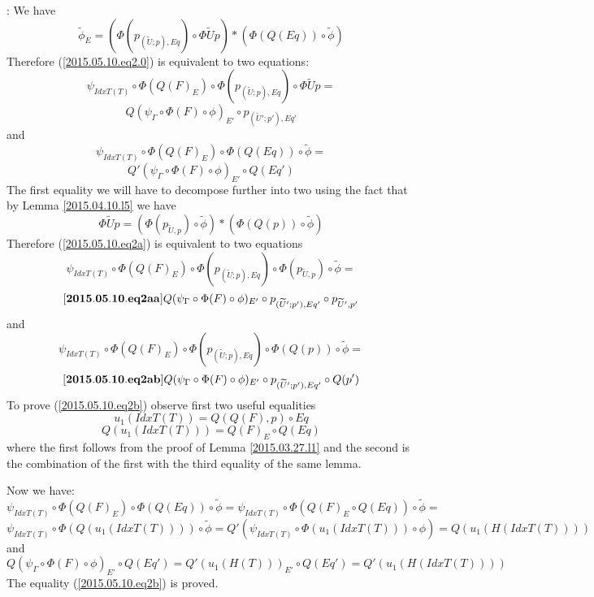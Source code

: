\documentclass[12pt]{article}
\newenvironment{eq}{\begin{equation}}{\end{equation}}
\newenvironment{myproof}{{\bf Proof}:}{\vskip 5mm }
\newcommand{\llabel}[1]{\label{#1}[{\bf #1}]}
\newcommand{\wt}{\widetilde}
\begin{document}
\begin{myproof}
We have 
%
$$\wt{\phi}_E=(\Phi(p_{(\wt{U};p),Eq})\circ \Phi\wt{U}p)*(\Phi(Q(Eq))\circ\wt{\phi})$$
%
Therefore (\ref{2015.05.10.eq2.0}) is equivalent to two equations:
%
$$\psi_{IdxT(T)}\circ \Phi(Q(F)_E)\circ \Phi(p_{(\wt{U};p),Eq})\circ \Phi\wt{U}p=$$
\begin{eq}
\label{2015.05.10.eq2a}
Q(\psi_{\Gamma}\circ \Phi(F)\circ \phi)_{E'}\circ p_{(\wt{U}';p'),Eq'}
\end{eq}
%
and
%
$$\psi_{IdxT(T)}\circ \Phi(Q(F)_E)\circ \Phi(Q(Eq))\circ\wt{\phi}=$$
\begin{eq}
\label{2015.05.10.eq2b}
Q'(\psi_{\Gamma}\circ \Phi(F)\circ \phi)_{E'}\circ Q(Eq')
\end{eq}
%
The first equality we will have to decompose further into two using the fact that by Lemma \ref{2015.04.10.l5} we have 
%
$$\Phi\wt{U}p=(\Phi(p_{\wt{U},p})\circ\wt{\phi})*(\Phi(Q(p))\circ \wt{\phi})$$
%
Therefore (\ref{2015.05.10.eq2a}) is equivalent to two equations
%
$$\psi_{IdxT(T)}\circ \Phi(Q(F)_E)\circ \Phi(p_{(\wt{U};p),Eq})\circ \Phi(p_{\wt{U},p})\circ\wt{\phi}=$$
\begin{eq}
\llabel{2015.05.10.eq2aa}
Q(\psi_{\Gamma}\circ \Phi(F)\circ \phi)_{E'}\circ p_{(\wt{U}';p'),Eq'}\circ p_{\wt{U}',p'}
\end{eq}
%
and
%
$$\psi_{IdxT(T)}\circ \Phi(Q(F)_E)\circ \Phi(p_{(\wt{U};p),Eq})\circ \Phi(Q(p))\circ\wt{\phi}=$$
\begin{eq}
\llabel{2015.05.10.eq2ab}
Q(\psi_{\Gamma}\circ \Phi(F)\circ \phi)_{E'}\circ p_{(\wt{U}';p'),Eq'}\circ Q(p')
\end{eq}
%
To prove (\ref{2015.05.10.eq2b}) observe first two useful equalities
%
$$u_1(IdxT(T))=Q(Q(F),p)\circ Eq$$
%
$$Q(u_1(IdxT(T)))=Q(F)_{E}\circ Q(Eq)$$
%
where the first follows from the proof of Lemma \ref{2015.03.27.l1} and the second is the combination of the first with the third equality of the same lemma. 

Now we have:
%
$$\psi_{IdxT(T)}\circ \Phi(Q(F)_E)\circ \Phi(Q(Eq))\circ\wt{\phi}=\psi_{IdxT(T)}\circ \Phi(Q(F)_E\circ Q(Eq))\circ\wt{\phi}=$$
$$\psi_{IdxT(T)}\circ \Phi(Q(u_1(IdxT(T))))\circ \wt{\phi}=Q'(\psi_{IdxT(T)}\circ \Phi(u_1(IdxT(T)))\circ \phi)=Q(u_1(H(IdxT(T))))$$
%
and
%
$$Q(\psi_{\Gamma}\circ \Phi(F)\circ \phi)_{E'}\circ Q(Eq')=Q'(u_1(H(T)))_{E'}\circ Q(Eq')=Q'(u_1(H(IdxT(T))))$$
%
The equality (\ref{2015.05.10.eq2b}) is proved. 


\end{myproof}
\end{document}
